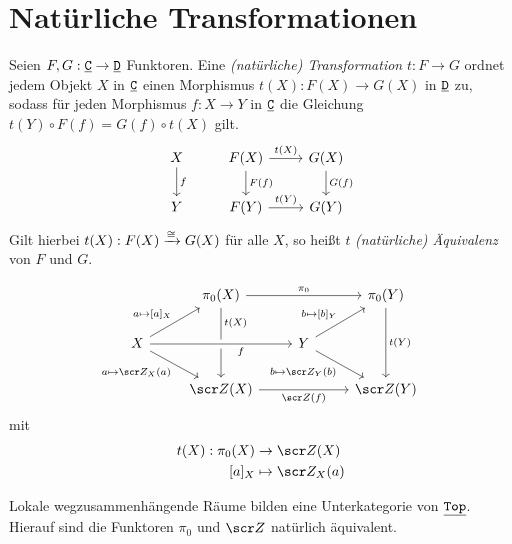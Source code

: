 \section{Natürliche Transformationen}


\begin{df}
	Seien $F, G: \underline{\mathtt{C}} \to \underline{\mathtt{D}}$ Funktoren.
	Eine \emph{(natürliche) Transformation} $t: F \to G$ ordnet jedem Objekt $X$ in $\underline{\mathtt{C}}$ einen Morphismus $t(X): F(X) \to G(X)$ in $\underline{\mathtt{D}}$ zu, sodass für jeden Morphismus $f: X \to Y$ in $\underline{\mathtt{C}}$ die Gleichung $t(Y) \circ F(f) = G(f) \circ t(X)$ gilt.
	\[
		\begin{tikzcd}
			X \arrow{d}{f} & F(X) \arrow{d}{F(f)} \arrow{r}{t(X)} & G(X) \arrow{d}{G(f)} \\
			Y & F(Y) \arrow{r}{t(Y)} & G(Y)
		\end{tikzcd}
	\]
	Gilt hierbei $t(X) : F(X) \xrightarrow{\cong} G(X)$ für alle $X$, so heißt $t$ \emph{(natürliche) Äquivalenz} von $F$ und $G$.
\end{df}

\begin{ex}
	\[
		\begin{tikzcd}
			~ & \pi_0(X) \arrow{dd}[yshift=5mm]{t(X)} \arrow{rr}{\pi_0} & & \pi_0(Y) \arrow{dd}{t(Y)} \\
			X \arrow{ur}{a\mapsto [a]_X} \arrow{dr}[swap]{a\mapsto \scr Z_X(a)} \arrow[crossing over]{rr}[swap,xshift=5mm]{f} & & Y \arrow{ru}{b\mapsto[b]_Y} \arrow{dr}[swap]{b\mapsto \scr Z_Y(b)} & \\
			& \scr Z(X) \arrow{rr}[below]{\scr Z(f)} && \scr Z(Y)
		\end{tikzcd}
	\]
	mit
	\begin{align*}
		t(X): \pi_0(X) &\to \scr Z(X) \\
		[a]_X &\mapsto \scr Z_X(a)
	\end{align*}
	\begin{note}
		Lokale wegzusammenhängende Räume bilden eine Unterkategorie von $\underline{\mathtt{Top}}$.
		Hierauf sind die Funktoren $\pi_0$ und $\scr Z$ natürlich äquivalent.
	\end{note}
\end{ex}
